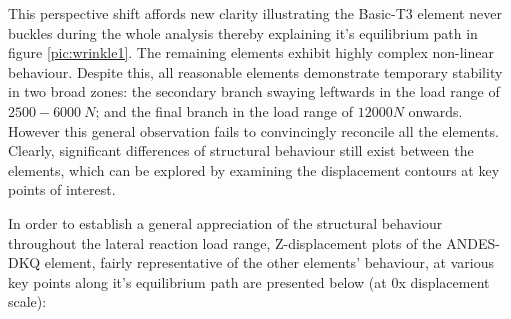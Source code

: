 This perspective shift affords new clarity illustrating the Basic-T3 element never buckles during the whole analysis thereby explaining it's equilibrium path in figure \ref{pic:wrinkle1}. The remaining elements exhibit highly complex non-linear behaviour. Despite this, all reasonable elements demonstrate temporary stability in two broad zones: the secondary branch swaying leftwards in the load range of $2500 - 6000\ N$; and the final branch in the load range of $12000 N$ onwards. However this general observation fails to convincingly reconcile all the elements. Clearly, significant differences of structural behaviour still exist between the elements, which can be explored by examining the displacement contours at key points of interest.

In order to establish a general appreciation of the structural behaviour throughout the lateral reaction load range, Z-displacement plots of the ANDES-DKQ element, fairly representative of the other elements' behaviour, at various key points along it's equilibrium path are presented below (at 0x displacement scale):

